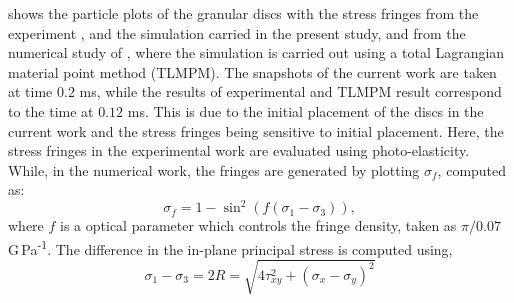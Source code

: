  shows the particle plots of the granular
discs with the stress fringes from the experiment \parencite{guilkey2001improved},
and the simulation carried in the present study, and from the numerical study
of \textcite{de2021modelling}, where the simulation is carried out using a total
Lagrangian material point method (TLMPM). The snapshots of the current work
are taken at time $0.2$ ms, while the results of experimental and TLMPM result
correspond to the time at $0.12$ ms. This is due to the initial placement of
the discs in the current work and the stress fringes being sensitive to
initial placement. Here, the stress fringes in the experimental work are
evaluated using photo-elasticity. While, in the numerical work, the fringes
are generated by plotting $\sigma_f$, computed as:
\begin{equation}
  \label{eq:stress-fringe-formula}
  \sigma_f = 1 - \sin^2(f (\sigma_1 - \sigma_3)),
\end{equation}
where $f$ is a optical parameter which controls the fringe density, taken as $\pi/0.07$
G\,Pa\textsuperscript{-1}. The difference in the in-plane principal stress is computed using,
\begin{equation}
  \label{eq:principal-stress-difference}
  \sigma_1 - \sigma_3 = 2R = \sqrt{4 \tau_{xy}^2 + (\sigma_x - \sigma_y)^2}
\end{equation}
